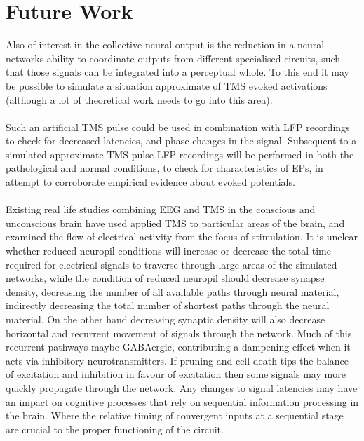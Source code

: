 \documentclass[a4paper,11pt]{article}
\begin{document}
\section{Future Work}
Also of interest in the collective neural output is the reduction in a neural networks ability to coordinate outputs from different specialised circuits, such that those signals can be integrated into a perceptual whole. To this end it may be possible to simulate a situation approximate of TMS evoked activations (although a lot of theoretical work needs to go into this area).\\
\\
Such an artificial TMS pulse could be used in combination with LFP recordings to check for decreased latencies, and phase changes in the signal. Subsequent to a simulated approximate TMS pulse LFP recordings will be performed in both the pathological and normal conditions, to check for characteristics of EPs, in attempt to corroborate empirical evidence about evoked potentials.\\
\\
Existing real life studies combining EEG and TMS in the conscious and unconscious brain have used applied TMS to particular areas of the brain, and examined the flow of electrical activity from the focus of stimulation\cite{sarasso2014quantifying}. It is unclear whether reduced neuropil conditions will increase or decrease the total time required for electrical signals to traverse through large areas of the simulated networks, while the condition of reduced neuropil should decrease synapse density, decreasing the number of all available paths through neural material,  indirectly decreasing the total number of shortest paths through the neural material. On the other hand decreasing synaptic density will also decrease horizontal\cite{lin2014polarity} and recurrent movement of signals through the network. Much of this recurrent pathways maybe GABAergic, contributing a dampening effect when it acts via inhibitory neurotransmitters. If pruning and cell death tips the balance of excitation and inhibition in favour of excitation then some signals may more quickly propagate through the network. Any changes to signal latencies may have an impact on cognitive processes that rely on sequential information processing in the brain. Where the relative timing of convergent inputs at a sequential stage are crucial to the proper functioning of the circuit.\\
\\
\\
\end{document}
